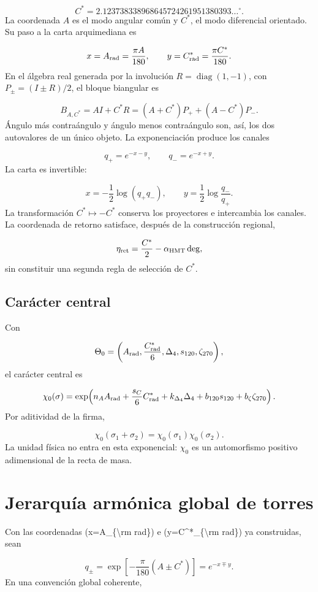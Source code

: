 \[
 C^*=2.123738338968645724261951380393\ldots{}^\circ.
\]
La coordenada \(A\) es el modo angular común y \(C^*\), el modo diferencial orientado. Su paso a la carta arquimediana es

\[
 x=A_{\rm rad}=\frac{\pi A}{180},
 \qquad
 y=C^*_{\rm rad}=\frac{\pi C^*}{180}.
\]
En el álgebra real generada por la involución \(R=\operatorname{diag}(1,-1)\), con \(P_\pm=(I\pm R)/2\), el bloque biangular es

\[
 B_{A,C^*}=AI+C^*R
 =(A+C^*)P_++(A-C^*)P_-.
\]
Ángulo más contraángulo y ángulo menos contraángulo son, así, los dos autovalores de un único objeto. La exponenciación produce los canales

\[
 q_+=e^{-x-y},\qquad q_-=e^{-x+y}.
\]
La carta es invertible:

\[
 x=-\frac12\log(q_+q_-),
 \qquad
 y=\frac12\log\frac{q_-}{q_+}.
\]
La transformación \(C^*\mapsto-C^*\) conserva los proyectores e intercambia los canales. La coordenada de retorno satisface, después de la construcción regional,

\[
 \eta_{\rm ret}=\frac{C^*}{2}-\alpha_{\rm HMT}\,{\rm deg},
\]
sin constituir una segunda regla de selección de \(C^*\).

\subsection{Carácter central}
Con

\[
 \Theta_0=
 \left(A_{\rm rad},\frac{C^*_{\rm rad}}6,
 \Delta_4,s_{120},\zeta_{270}\right),
\]
el carácter central es

\[
 \chi_0(\sigma)=
 \exp\!\left(
 n_AA_{\rm rad}+\frac{s_C}{6}C^*_{\rm rad}
 +k_{\Delta_4}\Delta_4+b_{120}s_{120}+b_\zeta\zeta_{270}
 \right).
\]
Por aditividad de la firma,

\[
 \chi_0(\sigma_1+\sigma_2)=\chi_0(\sigma_1)\chi_0(\sigma_2).
\]
La unidad física no entra en esta exponencial: \(\chi_0\) es un automorfismo positivo adimensional de la recta de masa.

\section{Jerarquía armónica global de torres}
Con las coordenadas (x=\allowbreak{}A\_\{\textbackslash{}rm rad\}) e (y=\allowbreak{}C\textasciicircum{}*\_\{\textbackslash{}rm rad\}) ya construidas, sean

\[
 q_\pm=\exp\!\left[-\frac{\pi}{180}(A\pm C^*)\right]
 =e^{-x\mp y}.
\]
En una convención global coherente,


